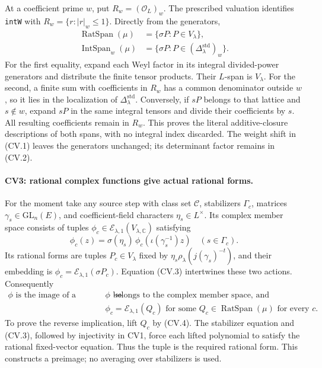 At a coefficient prime \(w\), put
\(R_w=(\mathcal O_L)_w\).
The prescribed valuation identifies \texttt{intW} with
\(R_w=\{r:|r|_w\le1\}\). Directly from the generators,
\[
 \begin{split}
 \operatorname{RatSpan}(\mu)
       &=\{\sigma P:P\in V_\lambda\},\\
 \operatorname{IntSpan}_w(\mu)
       &=\{\sigma P:P\in
                      (\Delta_\lambda^{\mathrm{std}})_w\}.
 \end{split}                                                   \tag{CV.4}
\]
For the first equality, expand each Weyl factor in its integral
divided-power generators and distribute the finite tensor
products. Their \(L\)-span is \(V_\lambda\).
For the second, a finite sum with coefficients in \(R_w\)
has a common denominator outside \(w\), so it lies in the
localization of \(\Delta_\lambda^{\mathrm{std}}\).
Conversely, if \(sP\) belongs to that lattice and \(s\notin w\),
expand \(sP\) in the same integral tensors and divide their
coefficients by \(s\). All resulting coefficients remain in
\(R_w\). This proves the literal additive-closure descriptions
of both spans, with no integral index discarded.
The weight shift in (CV.1) leaves the generators unchanged;
its determinant factor remains in (CV.2).

\paragraph{CV3: rational complex functions give actual rational forms.}
For the moment take any source step with class set
\(\mathcal C\), stabilizers \(\Gamma_c\), matrices
\(\gamma_s\in\mathrm{GL}_n(E)\), and coefficient-field
characters \(\eta_s\in L^\times\). Its complex member space
consists of tuples \(\phi_c\in
\mathcal E_{\lambda,1}(V_{\lambda,\mathbb C})\) satisfying
\[
 \phi_c(z)=\sigma(\eta_s)\,
                 \phi_c(\iota(\gamma_s^{-1})z)
                       \quad(s\in\Gamma_c).                  \tag{CV.5}
\]
Its rational forms are tuples \(P_c\in V_\lambda\) fixed by
\(\eta_s\rho_\lambda(j(\gamma_s)^{-t})\), and their
embedding is \(\phi_c=\mathcal E_{\lambda,1}(\sigma P_c)\).
Equation (CV.3) intertwines these two actions. Consequently
\[
 \begin{split}
 \phi\text{ is the image of a rational form}
 \quad\Longleftrightarrow\quad&
 \phi\text{ belongs to the complex member space, and}\\[-2pt]
 &\phi_c=\mathcal E_{\lambda,1}(Q_c)
     \text{ for some }Q_c\in\operatorname{RatSpan}(\mu)
     \text{ for every }c.
 \end{split}                                                   \tag{CV.6}
\]
To prove the reverse implication, lift \(Q_c\) by (CV.4).
The stabilizer equation and (CV.3), followed by injectivity
in CV1, force each lifted polynomial to satisfy the rational
fixed-vector equation. Thus the tuple is the required
rational form. This constructs a preimage; no averaging
over stabilizers is used.

